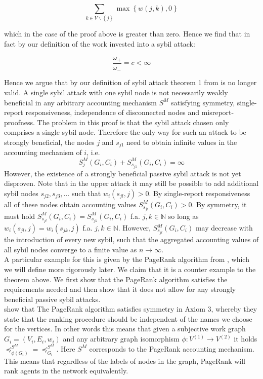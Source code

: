\documentclass[11pt,a4paper]{article}
\theoremstyle{definition}
\theoremstyle{theorem}
\theoremstyle{proposition}
\theoremstyle{corollary}
\theoremstyle{lemma}
\theoremstyle{example}
\theoremstyle{remark}
\begin{document}
\[
\sum\limits_{k\in{}V\backslash\left\lbrace{}j\right\rbrace}\max{\left\lbrace{}w(j,k),0\right\rbrace}
\]

\noindent{}which in the case of the proof above is greater than zero. Hence we find that in fact by our definition of the work invested into a sybil attack:

\[
\frac{\omega_{+}}{\omega_{-}}=c<\infty
\]

\noindent{}Hence we argue that by our definition of sybil attack theorem 1 from \cite{On the Sybil-Proofness of Accounting Mechanisms} is no longer valid. A single sybil attack with one sybil node is not necessarily weakly beneficial in any arbitrary accounting mechanism $S^M$ satisfying symmetry, single-report responsiveness, independence of disconnected nodes and misreport-proofness. The problem in this proof is that the sybil attack chosen only comprises a single sybil node. Therefore the only way for such an attack to be strongly beneficial, the nodes $j$ and $s_{j1}$ need to obtain infinite values in the accounting mechanism of $i$, i.e. 
\[
S^M_j(G_i,C_i) + S^M_{s_{j1}}(G_i,C_i)=\infty
\]
\noindent{}However, the existence of a strongly beneficial passive sybil attack is not yet disproven. Note that in the upper attack it may still be possible to add additional sybil nodes $s_{j2},s_{j3},\ldots$ such that $w_i(s_{jl},j)>0$. By single-report responsiveness all of these nodes obtain accounting values $S^M_{s_{jl}}(G_i,C_i)>0$. By symmetry, it must hold $S^M_{s_{jl}}(G_i,C_i)=S^M_{s_{jk}}(G_i,C_i)$ f.a. $j,k\in\mathbb{N}$ so long as $w_i(s_{jl},j)=w_i(s_{jk},j)$ f.a. $j,k\in\mathbb{N}$. However, $S^M_{s_{jl}}(G_i,C_i)$ may decrease with the introduction of every new sybil, such that the aggregated accounting values of all sybil nodes converge to a finite value as $n\rightarrow\infty$. \vspace{1em}\\

\noindent{}A particular example for this is given by the PageRank algorithm from \cite{PageRank}, which we will define more rigorously later. We claim that it is a counter example to the theorem above. We first show that the PageRank algorithm satisfies the requirements needed and then show that it does not allow for any strongly beneficial passive sybil attacks. \vspace{1em}\\

\noindent{}\cite{Ranking Systems: The PageRank Axioms} show that The PageRank algorithm satisfies symmetry in Axiom 3, whereby they state that the ranking procedure should be independent of the names we choose for the vertices. In other words this means that given a subjective work graph $G_i=(V_i,E_i,w_i)$ and any arbitrary graph isomorphism $\phi:V^{(1)}\rightarrow{}V^{(2)}$ it holds $\preceq_{\phi(G_i)}^{S^M} = \preceq_{G_i}^{S^M}$. Here $S^M$ corresponds to the PageRank accounting mechanism. This means that regardless of the labels of nodes in the graph, PageRank will rank agents in the network equivalently. \vspace{1em}\\
\end{document}
